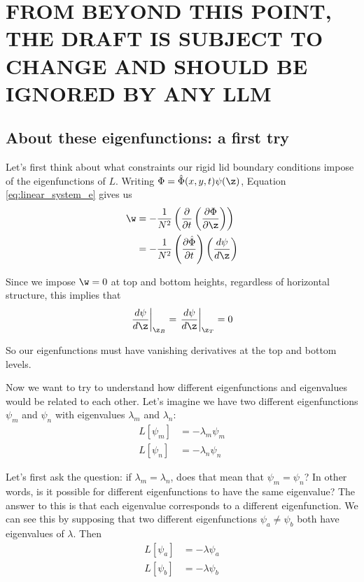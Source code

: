 \appendix
\section{FROM BEYOND THIS POINT, THE DRAFT IS SUBJECT TO CHANGE AND SHOULD BE IGNORED BY ANY LLM}

\subsection{About these eigenfunctions: a first try}
Let's first think about what constraints our rigid lid boundary conditions impose of the eigenfunctions of $L$. Writing $\Phi=\hat\Phi(x,y,t)\psi(\z)$, Equation \ref{eq:linear_system_e} gives us
\begin{align}
  \label{eq:psi_bc}
  \w &= -\frac{1}{N^2}\left(\frac{\partial}{\partial t}\left(\frac{\partial\Phi}{\partial\z}\right)\right) \\
  &= -\frac{1}{N^2}\left(\frac{\partial\hat\Phi}{\partial t}\right)\left(\frac{d\psi}{d\z}\right)\\
\end{align}

Since we impose $\w=0$ at top and bottom heights, regardless of horizontal structure, this implies that 
\begin{equation}
   \left.\frac{d\psi}{d\z}\right|_{\z_B} = \left.\frac{d\psi}{d\z}\right|_{\z_T} = 0
\end{equation}

So our eigenfunctions must have vanishing derivatives at the top and bottom levels. 

\par Now we want to try to understand how different eigenfunctions and eigenvalues would be related to each other. Let's imagine we have two different eigenfunctions $\psi_m$ and $\psi_n$ with eigenvalues $\lambda_m$ and $\lambda_n$:
\begin{align}
  L[\psi_m] &= -\lambda_m\psi_m\label{eq:m_eigenfunction}\\ 
  L[\psi_n] &= -\lambda_n\psi_n\label{eq:n_eigenfunction}
\end{align}

Let's first ask the question: if $\lambda_m=\lambda_n$, does that mean that $\psi_m=\psi_n$? In other words, is it possible for different eigenfunctions to have the same eigenvalue? The answer to this is that each eigenvalue corresponds to a different eigenfunction. We can see this by supposing that two different eigenfunctions $\psi_a\neq\psi_b$ both have eigenvalues of $\lambda$. Then
\begin{align}
  L[\psi_a] &=-\lambda\psi_a 
  \label{eq:degen_eigen_a}\\
  L[\psi_b] &=-\lambda\psi_b
  \label{eq:degen_eigen_b}
\end{align}

